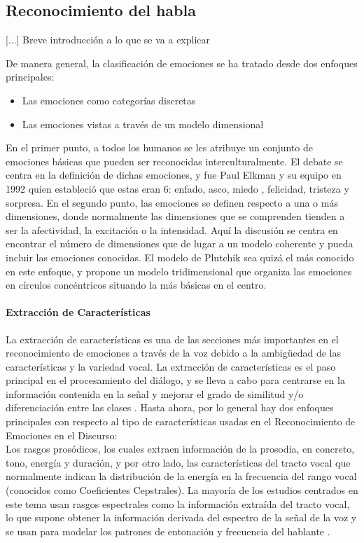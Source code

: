 \documentclass[11pt,a4paper,spanish]{book}
\begin{document}
	\subsection{Reconocimiento del habla}
	[...] Breve introducción a lo que se va a explicar
	
	
	De manera general, la clasificación de emociones se ha tratado desde dos enfoques principales:
	\begin{itemize}
		\item Las emociones como categorías discretas
		\item Las emociones vistas a través de un modelo dimensional
	\end{itemize}

	En el primer punto, a todos los humanos se les atribuye un conjunto de emociones básicas que pueden ser reconocidas interculturalmente. El debate se centra en la definición de dichas emociones, y fue Paul Elkman y su equipo en 1992 \cite{Ekman1992} quien estableció que estas eran 6: enfado, asco, miedo , felicidad, tristeza y sorpresa.
	En el segundo punto, las emociones se definen respecto a una o más dimensiones, donde normalmente las dimensiones que se comprenden tienden a ser la afectividad, la excitación o la intensidad. Aquí la discusión se centra en encontrar el número de dimensiones que de lugar a un modelo coherente y pueda incluir las emociones conocidas. El modelo de Plutchik \cite{Plutchik2001} sea quizá el más conocido en este enfoque, y propone un modelo tridimensional que organiza las emociones en círculos concéntricos situando la más básicas en el centro. \hfill \break
	
	\paragraph{Extracción de Características}
	La extracción de características es una de las secciones más importantes en el reconocimiento de emociones a través de la voz debido a la ambigüedad de las características y la variedad vocal. La extracción de características es el paso principal en el procesamiento del diálogo, y se lleva a cabo para centrarse en la información contenida en la señal y mejorar el grado de similitud y/o diferenciación entre las clases \cite{Hellbernd2016}. Hasta ahora, por lo general hay dos enfoques principales  con respecto al tipo de características usadas en el Reconocimiento de Emociones en el Discurso:\\
	Los rasgos prosódicos, los cuales extraen información de la prosodia, en concreto, tono, energía y duración, y por otro lado, las características del tracto vocal que normalmente indican la distribución de la energía en la frecuencia del rango vocal (conocidos como Coeficientes Cepstrales).
	La mayoría de los estudios centrados en este tema usan rasgos espectrales como la información extraída del tracto vocal, lo que supone obtener la información derivada del espectro de la señal de la voz y se usan para modelar los patrones de entonación y frecuencia del hablante \cite{Langari2020}.\\
	
\end{document}
